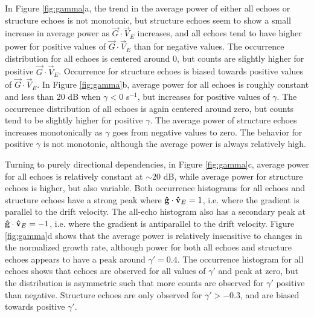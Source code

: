 In Figure \ref{fig:gamma}a, the trend in the average power of either all echoes or structure echoes is not monotonic, but structure echoes seem to show a small increase in average power as \(\vec{G}\cdot\vec{V}_E\) increases, and all echoes tend to have higher power for positive values of \(\vec{G}\cdot\vec{V}_E\) than for negative values. The occurrence distribution for all echoes is centered around 0, but counts are slightly higher for positive \(\vec{G}\cdot\vec{V}_E\).  Occurrence for structure echoes is biased towards positive values of \(\vec{G}\cdot\vec{V}_E\).  In Figure \ref{fig:gamma}b, average power for all echoes is roughly constant and less than 20 dB when \(\gamma < 0\) s\(^{-1}\), but increases for positive values of \(\gamma\).  The occurrence distribution of all echoes is again centered around zero, but counts tend to be slightly higher for positive \(\gamma\).  The average power of structure echoes increases monotonically as \(\gamma\) goes from negative values to zero.  The behavior for positive \(\gamma\) is not monotonic, although the average power is always relatively high.

Turning to purely directional dependencies, in Figure \ref{fig:gamma}c, average power for all echoes is relatively constant at \(\sim\)20 dB, while average power for structure echoes is higher, but also variable.  Both occurrence histograms for all echoes and structure echoes have a strong peak where \(\mathbf{\hat{g}}\cdot\mathbf{\hat{v}}_E = 1\), i.e. where the gradient is parallel to the drift velocity. The all-echo histogram also has a secondary peak at \(\mathbf{\hat{g}}\cdot\mathbf{\hat{v}}_E = -1\), i.e. where the gradient is antiparallel to the drift velocity.  Figure \ref{fig:gamma}d shows that the average power is relatively insensitive to changes in the normalized growth rate, although power for both all echoes and structure echoes appears to have a peak around \(\gamma'=0.4\).  The occurrence histogram for all echoes shows that echoes are observed for all values of \(\gamma'\) and peak at zero, but the distribution is asymmetric such that more counts are observed for \(\gamma'\) positive than negative.  Structure echoes are only observed for \(\gamma'>-0.3\), and are biased towards positive \(\gamma'\).

